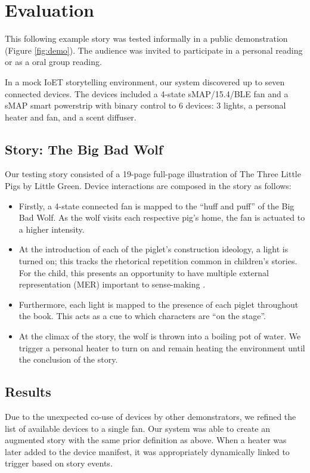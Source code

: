 \documentclass{sigchi}
\begin{document}
\section{Evaluation}
This following example story was tested informally in a public demonstration (Figure \ref{fig:demo}). The audience was invited to participate in a personal reading or as a oral group reading.

In a mock IoET storytelling environment, our system discovered up to seven connected devices. The devices included a 4-state sMAP/15.4/BLE fan and a sMAP smart powerstrip with binary control to 6 devices: 3 lights, a personal heater and fan, and a scent diffuser.  

\subsection{Story: The Big Bad Wolf}
Our testing story consisted of a 19-page full-page illustration of The Three Little Pigs by Little Green. Device interactions are composed in the story as follows:
\begin{itemize}
\item Firstly, a 4-state connected fan is mapped to the ``huff and puff'' of the Big Bad Wolf. As the wolf visits each respective pig's home, the fan is actuated to a higher intensity. 
\item At the introduction of each of the piglet's construction ideology, a light is turned on; this tracks the rhetorical repetition common in children's stories. For the child, this presents an opportunity to have multiple external representation (MER) important to sense-making \cite{ainsworth_deft:_2006}. 
\item Furthermore, each light is mapped to the presence of each piglet throughout the book. This acts as a cue to which characters are ``on the stage''. 
\item At the climax of the story, the wolf is thrown into a boiling pot of water. We trigger a personal heater to turn on and remain heating the environment until the conclusion of the story. 
\end{itemize}

\subsection{Results}
Due to the unexpected co-use of devices by other demonstrators, we refined the list of available devices to a single fan. Our system was able to create an augmented story with the same prior definition as above.
When a heater was later added to the device manifest, it was appropriately dynamically linked to trigger based on story events. 
\end{document}
